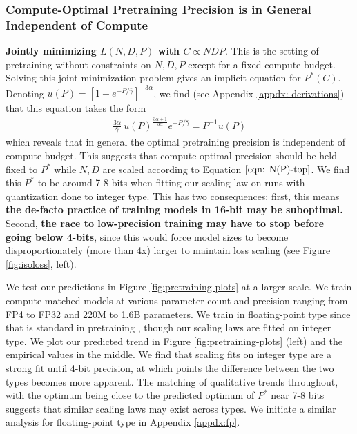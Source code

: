 \documentclass[11pt]{article}
\begin{document}
\subsubsection{Compute-Optimal Pretraining Precision is in General Independent of Compute} 

\textbf{Jointly minimizing $L(N, D, P)$ with $C \propto NDP$}. This is the setting of pretraining without constraints on $N, D, P$ except for a fixed compute budget. Solving this joint minimization problem gives an implicit equation for $P^*(C)$. Denoting $u(P) = [1-e^{-P/\bar{\gamma}}]^{-3\alpha}$, we find (see Appendix \ref{appdx: derivations}) that this equation takes the form
%
\begin{align}
    \frac{3\alpha}{\bar{\gamma}}\ u(P)^{\frac{3\alpha+1}{3\alpha}} e^{- P/\bar{\gamma}} = P^{-1 } u(P)
\end{align}
%
 which reveals that in general the optimal pretraining precision is independent of compute budget. This suggests that compute-optimal precision should be held fixed to $P^*$ while $N, D$ are scaled according to Equation $\ref{eqn: N(P)-top}$. We find this $P^*$ to be around 7-8 bits when fitting our scaling law on runs with quantization done to integer type. This has two consequences: first, this means \textbf{the de-facto practice of training models in 16-bit may be suboptimal.} Second,\textbf{ the race to low-precision training may have to stop before going below 4-bits}, since this would force model sizes to become disproportionately (more than 4x) larger to maintain loss scaling (see Figure \ref{fig:isoloss}, left). 
 
 We test our predictions in Figure \ref{fig:pretraining-plots} at a larger scale. We train compute-matched models at various parameter count and precision ranging from FP4 to FP32 and 220M to 1.6B parameters. We train in floating-point type since that is standard in pretraining \citep{groeneveld2024olmo, deitke2024molmo}, though our scaling laws are fitted on integer type. We plot our predicted trend in Figure \ref{fig:pretraining-plots} (left) and the empirical values in the middle. We find that scaling fits on integer type are a strong fit until 4-bit precision, at which points the difference between the two types becomes more apparent. The matching of qualitative trends throughout, with the optimum being close to the predicted optimum of $P^*$ near 7-8 bits suggests that similar scaling laws may exist across types. We initiate a similar analysis for floating-point type in Appendix \ref{appdx:fp}. 
 
\end{document}
